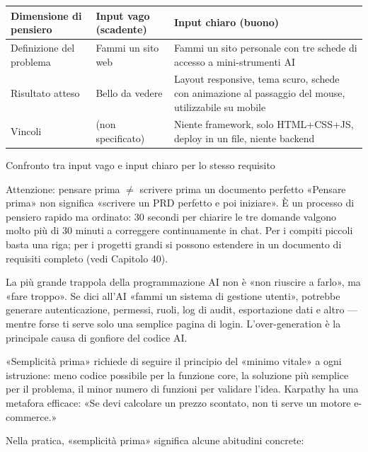 \begin{center}
\begin{tabularx}{\linewidth}{|X|X|X|}
\hline
\textbf{Dimensione di pensiero} & \textbf{Input vago (scadente)} & \textbf{Input chiaro (buono)} \tabularnewline
\hline
Definizione del problema & Fammi un sito web & Fammi un sito personale con tre schede di accesso a mini-strumenti AI \tabularnewline
Risultato atteso & Bello da vedere & Layout responsive, tema scuro, schede con animazione al passaggio del mouse, utilizzabile su mobile \tabularnewline
Vincoli & (non specificato) & Niente framework, solo HTML+CSS+JS, deploy in un file, niente backend \tabularnewline
\hline
\end{tabularx}
\end{center}

\begin{center}\small\color{gray}Confronto tra input vago e input chiaro per lo stesso requisito\end{center}

\begin{tcbwarn}{Attenzione: pensare prima $\neq$ scrivere prima un documento perfetto}
«Pensare prima» non significa «scrivere un PRD perfetto e poi iniziare». È un processo di pensiero rapido ma ordinato: 30 secondi per chiarire le tre domande valgono molto più di 30 minuti a correggere continuamente in chat. Per i compiti piccoli basta una riga; per i progetti grandi si possono estendere in un documento di requisiti completo (vedi Capitolo 40).

\end{tcbwarn}


La più grande trappola della programmazione AI non è «non riuscire a farlo», ma «fare troppo». Se dici all'AI «fammi un sistema di gestione utenti», potrebbe generare autenticazione, permessi, ruoli, log di audit, esportazione dati e altro — mentre forse ti serve solo una semplice pagina di login. L'over-generation è la principale causa di gonfiore del codice AI.

«Semplicità prima» richiede di seguire il principio del «minimo vitale» a ogni istruzione: meno codice possibile per la funzione core, la soluzione più semplice per il problema, il minor numero di funzioni per validare l'idea. Karpathy ha una metafora efficace: «Se devi calcolare un prezzo scontato, non ti serve un motore e-commerce.»

Nella pratica, «semplicità prima» significa alcune abitudini concrete:

